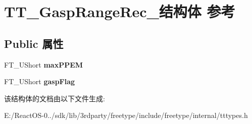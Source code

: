 \hypertarget{struct_t_t___gasp_range_rec__}{}\section{T\+T\+\_\+\+Gasp\+Range\+Rec\+\_\+结构体 参考}
\label{struct_t_t___gasp_range_rec__}
\subsection*{Public 属性}
\begin{DoxyCompactItemize}
\item 
\mbox{\label{struct_t_t___gasp_range_rec___aa3fab31f6c0659b4deff402e210e15c9}} 
F\+T\+\_\+\+U\+Short {\bfseries max\+P\+P\+EM}
\item 
\mbox{\label{struct_t_t___gasp_range_rec___a9fc298dc0e46d31507728ae25585118d}} 
F\+T\+\_\+\+U\+Short {\bfseries gasp\+Flag}
\end{DoxyCompactItemize}


该结构体的文档由以下文件生成\+:\begin{DoxyCompactItemize}
\item 
E\+:/\+React\+O\+S-\/0../sdk/lib/3rdparty/freetype/include/freetype/internal/tttypes.\+h\end{DoxyCompactItemize}
